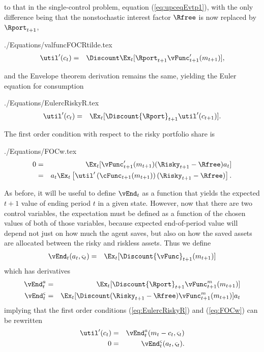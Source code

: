 \documentclass[titlepage]{\econtex}
\begin{document}
to that in the single-control problem, equation (\ref{eq:upceqEvtp1}),
with the only difference being that the nonstochastic interest factor
$\Rfree$ is now replaced by ${\Rport}_{t+1}$,
\begin{verbatimwrite}{./Equations/valfuncFOCRtilde.tex}
\begin{eqnarray}
        \util^{\prime}({c}_{t}) & = & \Discount \Ex_{t} [{\Rport}_{t+1} \vFunc^{\prime}_{t+1}({m}_{t+1})] \label{eq:valfuncFOCRtilde},
\end{eqnarray}
\end{verbatimwrite}

and the Envelope theorem derivation remains the same, 
yielding the Euler equation for consumption
\begin{verbatimwrite}{./Equations/EulercRiskyR.tex}
\begin{eqnarray}
        \util^{\prime}({c}_{t}) & = & \Ex_{t}[\Discount {\Rport}_{t+1} \util^{\prime}({c}_{t+1})]. \label{eq:EulercRiskyR}
\end{eqnarray}
\end{verbatimwrite}


The first order condition with respect to the risky portfolio share is
\begin{verbatimwrite}{./Equations/FOCw.tex}
\begin{eqnarray}
        0 & = & \Ex_{t}[{\vFunc}_{t+1}^{\prime}({m}_{t+1})(\Risky_{t+1}-\Rfree){a}_{t}] \notag
\\        & = & {a}_{t}\Ex_{t}\left[\util^{\prime}\left(\cFunc_{t+1}({m}_{t+1})\right)(\Risky_{t+1}-\Rfree)\right] \label{eq:FOCw}.
\end{eqnarray}
\end{verbatimwrite}


As before, it will be useful to define $\vEnd_{t}$ as a function that
yields the expected $t+1$ value of ending period $t$ in a given state.
However, now that there are two control variables, the expectation
must be defined as a function of the chosen values of both of those
variables, because expected end-of-period value will depend not just
on how much the agent saves, but also on how the saved assets are
allocated between the risky and riskless assets.  Thus we define
\begin{eqnarray*}
        \vEnd_{t}({a}_{t},\varsigma_{t}) & = & \Ex_{t}[\Discount {\vFunc}_{t+1}({m}_{t+1})]
\end{eqnarray*}
which has derivatives
\begin{eqnarray*}
        \vEnd_{t}^{{a}} & = & \Ex_{t}[\Discount {\Rport}_{t+1}{\vFunc}_{t+1}^{m}({m}_{t+1})]
\\      \vEnd_{t}^{\varsigma} & = & \Ex_{t}[\Discount (\Risky_{t+1}-\Rfree){\vFunc}_{t+1}^{m}({m}_{t+1})  ]a_{t}
\end{eqnarray*}
implying that the first order conditions (\ref{eq:EulercRiskyR}) and
(\ref{eq:FOCw}) can be rewritten
\begin{eqnarray}
        \util^{\prime}({c}_{t}) & = & \vEnd_{t}^{{a}}({m}_{t}-{c}_{t},\varsigma_{t})
\\      0 & = & \vEnd^{\varsigma}_{t}({a}_{t},\varsigma_{t}).
\end{eqnarray}
\end{document}
